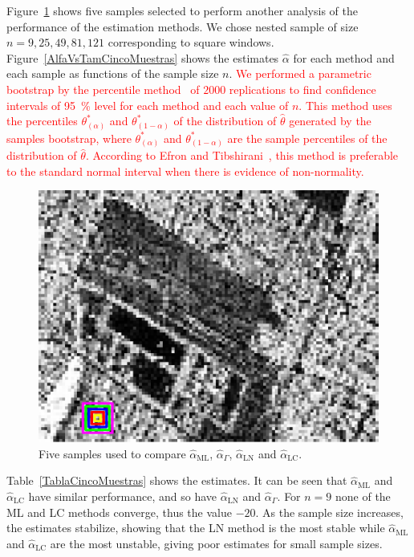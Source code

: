 \documentclass[twocolumn]{svjour3}
\begin{document}
	Figure~\ref{CincoMuestras} shows five samples selected to perform another analysis of the performance of the estimation methods. 
	We chose nested sample of size $n=9,25,49,81,121$ corresponding to square windows. 
	Figure~\ref{AlfaVsTamCincoMuestras} shows the estimates $\widehat{\alpha}$ for each method and each sample as functions of the sample size $n$. 
	\textcolor{red}{We performed a parametric bootstrap by the percentile method~\cite{Davison1997} of $2000$ replications to find confidence intervals of \SI{95}{\percent} level for each method and each value of $n$.     
	This method uses the percentiles $\theta^*_{(\alpha)}$ and $\theta^*_{(1-\alpha)}$ of the distribution of $\widehat{\theta} $ generated by the samples bootstrap, where $\theta^*_{(\alpha)}$ and $\theta^*_{(1-\alpha)}$ are the sample percentiles of the distribution of $\widehat{\theta} $. 
	According to Efron and Tibshirani~\cite{Efron93}, this method is preferable to the standard normal interval when there is evidence of non-normality. }
	
	\begin{figure}[hbt]
		\centering
		\includegraphics[width=0.7\linewidth]{../../../Figures/PaperTesis/CincoMuestras.eps}
		\caption{Five samples used to compare $\widehat{\alpha}_{\text{{ML}}}$, $\widehat{\alpha}_{\Gamma}$, $\widehat{\alpha}_{\text{{LN}}}$ and  $\widehat{\alpha}_{\text{{LC}}}$.}\label{CincoMuestras}
	\end{figure}
	
	Table~\ref{TablaCincoMuestras} shows the estimates. 
	It can be seen that $\widehat{\alpha}_{\text{{ML}}}$ and $\widehat{\alpha}_{\text{{LC}}}$ have similar performance, and so have $\widehat{\alpha}_{\text{{LN}}}$ and $\widehat{\alpha}_{\Gamma}$. 
	For $n= 9$ none of the ML and LC methods converge, thus the value $-20$. 
	As the sample size increases, the estimates stabilize, showing that the LN method is the most stable while $\widehat{\alpha}_{\text{{ML}}}$ and $\widehat{\alpha}_{\text{{LC}}}$ are the most unstable, giving poor estimates for small sample sizes.
	
\end{document}
